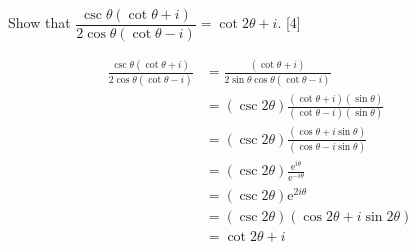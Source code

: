 \documentclass[12pt, a4 paper]{article}
\begin{document}
\begin{outline}[enumerate]
	\2 Show that $\dfrac{\csc{\theta}(\cot{\theta}+i)}{2\cos{\theta}(\cot{\theta}-i)} = \cot{2\theta}+i$. \hfill[4] %
	\begin{answer}
		\begin{align*}
			\frac{\csc{\theta}(\cot{\theta}+i)}{2\cos{\theta}(\cot{\theta}-i)} & = \frac{(\cot{\theta}+i)}{2\sin\theta\cos{\theta}(\cot{\theta}-i)}                \\
			                                                                   & = (\csc2\theta) \frac{(\cot{\theta}+i)(\sin\theta)}{(\cot{\theta}-i)(\sin\theta)} \\
			                                                                   & = (\csc2\theta) \frac{(\cos{\theta}+i\sin{\theta})}{(\cos{\theta}-i\sin{\theta})} \\
			                                                                   & = (\csc2\theta) \frac{\mathrm{e}^{i\theta}}{\mathrm{e}^{-i\theta}}                \\
			                                                                   & = (\csc2\theta) {\mathrm{e}^{2i\theta}}                                           \\
			                                                                   & = (\csc2\theta) (\cos{2\theta}+i\sin{2\theta})                                    \\
			                                                                   & = \cot{2\theta}+i                                                                 
		\end{align*}
	\end{answer}
			        

\end{outline}
\end{document}
